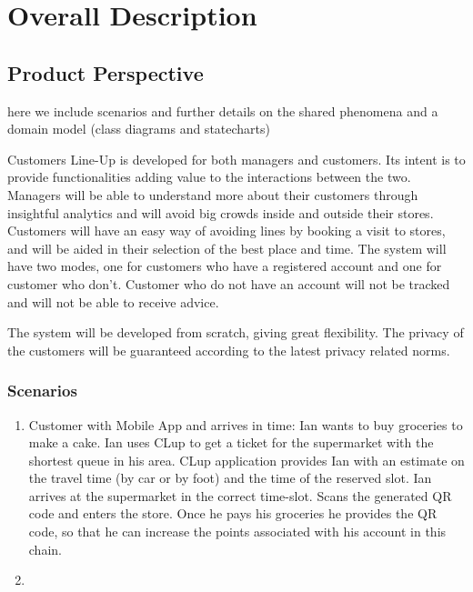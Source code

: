 \section{Overall Description}\label{sec:overall_desc}

\subsection{Product Perspective}

here we include scenarios and further details on the shared
phenomena and a domain model (class diagrams and statecharts)

Customers Line-Up is developed for both managers and customers.
Its intent is to provide functionalities adding value to the interactions between the two.
Managers will be able to understand more about their customers through insightful analytics and will avoid big crowds inside and outside their stores.
Customers will have an easy way of avoiding lines by booking a visit to stores, and will be aided in their selection of the best place and time.
The system will have two modes, one for customers who have a registered account and one for customer who don't.
Customer who do not have an account will not be tracked and will not be able to receive advice.

The system will be developed from scratch, giving great flexibility.
The privacy of the customers will be guaranteed according to the latest privacy related norms.

\subsubsection{Scenarios}
    \begin{enumerate}[label=\Alph*.]
        \item Customer with Mobile App and arrives in time: \newline
        Ian wants to buy groceries to make a cake. Ian uses CLup to get a ticket for the supermarket with the shortest queue in his area.
        CLup application provides Ian with an estimate on the travel time (by car or by foot) and the time of the reserved slot. 
        Ian arrives at the supermarket in the correct time-slot. Scans the generated QR code and enters the store. Once he pays
        his groceries he provides the QR code, so that he can increase the points associated with his account in this chain.
        \item 
    \end{enumerate}







